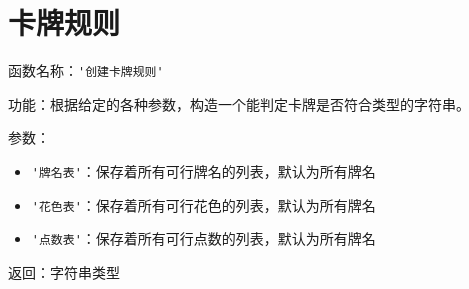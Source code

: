 \section{卡牌规则}

函数名称：\verb|'创建卡牌规则'|

功能：根据给定的各种参数，构造一个能判定卡牌是否符合类型的字符串。

参数：

\begin{itemize}
  \item \verb|'牌名表'|：保存着所有可行牌名的列表，默认为所有牌名
  \item \verb|'花色表'|：保存着所有可行花色的列表，默认为所有牌名
  \item \verb|'点数表'|：保存着所有可行点数的列表，默认为所有牌名
\end{itemize}

返回：字符串类型
